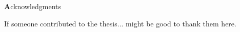 \clearemptydoublepage
{}
{}



\vspace*{2cm}

\begin{center}
{\Large \textbf Acknowledgments}
\end{center}

\vspace{1cm}




If someone contributed to the thesis... might be good to thank them here.
